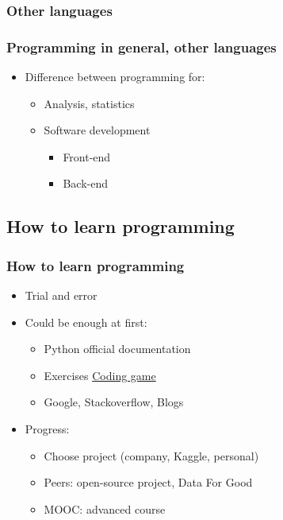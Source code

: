 \subsubsection{Other languages}

\begin{frame}\frametitle{Programming in general, other languages}

   \begin{itemize}
      \item Difference between programming for:
      \begin{itemize}
         \item Analysis, statistics
         \item Software development
         \begin{itemize}
            \item Front-end
            \item Back-end
         \end{itemize}
      \end{itemize}
   \end{itemize}

\end{frame}

\subsection{How to learn programming}

\begin{frame}\frametitle{How to learn programming}
   \begin{itemize}
      \item Trial and error
      \item Could be enough at first:
      \begin{itemize}
         \item Python official documentation
         \item Exercises \href{https://www.codingame.com/home}{Coding game}
         \item Google, Stackoverflow, Blogs
      \end{itemize}
      
      \item Progress:
      \begin{itemize}
         \item Choose project (company, Kaggle, personal)
         \item Peers: open-source project, Data For Good
         \item MOOC: advanced course
      \end{itemize}
   \end{itemize}
\end{frame}


